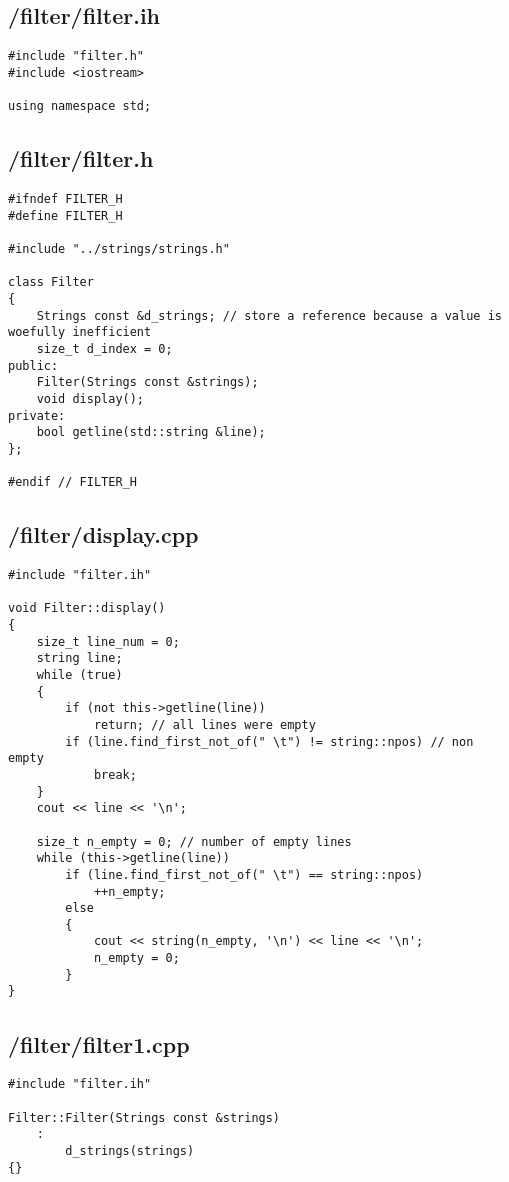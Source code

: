 \documentclass{article}
\begin{document}
\subsection*{/filter/filter.ih}
\begin{verbatim}
#include "filter.h"
#include <iostream>

using namespace std;
\end{verbatim}
\subsection*{/filter/filter.h}
\begin{verbatim}
#ifndef FILTER_H
#define FILTER_H

#include "../strings/strings.h"

class Filter 
{
    Strings const &d_strings; // store a reference because a value is woefully inefficient
    size_t d_index = 0;
public:
    Filter(Strings const &strings);
    void display();
private:
    bool getline(std::string &line);
};

#endif // FILTER_H
\end{verbatim}
\subsection*{/filter/display.cpp}
\begin{verbatim}
#include "filter.ih"

void Filter::display()
{
    size_t line_num = 0;
    string line;
    while (true)
    {
        if (not this->getline(line))
            return; // all lines were empty
        if (line.find_first_not_of(" \t") != string::npos) // non empty
            break;
    }
    cout << line << '\n';

    size_t n_empty = 0; // number of empty lines
    while (this->getline(line))
        if (line.find_first_not_of(" \t") == string::npos)
            ++n_empty;
        else
        {
            cout << string(n_empty, '\n') << line << '\n';
            n_empty = 0;
        }
}
\end{verbatim}
\subsection*{/filter/filter1.cpp}
\begin{verbatim}
#include "filter.ih"

Filter::Filter(Strings const &strings)
    :
        d_strings(strings)
{}
\end{verbatim}
\end{document}
